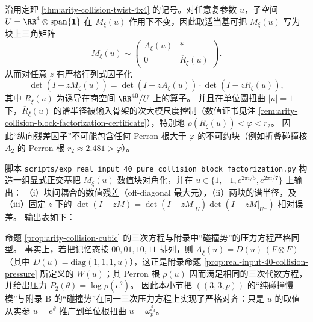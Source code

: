 \begin{remark}[块上三角分解与行列式因子化]\label{cor:arity-collision-det-factorization}
沿用定理 \ref{thm:arity-collision-twist-4x4} 的记号。对任意复参数 \(u\)，子空间
\(
U=\RR^{4}\otimes \mathrm{span}\{\mathbf{1}\}
\)
在 \(M_\xi(u)\) 作用下不变，因此取适当基可把 \(M_\xi(u)\) 写为块上三角矩阵
\[
M_\xi(u)\sim
\begin{pmatrix}
A_\xi(u) & *\\
0 & \overline R_\xi(u)
\end{pmatrix}.
\]
从而对任意 \(z\) 有严格行列式因子化
$$
\det(I-zM_\xi(u))=\det(I-zA_\xi(u))\cdot \det(I-z\overline R_\xi(u)),
$$
其中 \(\overline R_\xi(u)\) 为诱导在商空间 \(\RR^{40}/U\) 上的算子。
并且在单位圆扭曲 \(|u|=1\) 下，\(\overline R_\xi(u)\) 的谱半径被输入骨架的次大模尺度控制（数值证书见注 \ref{rem:arity-collision-block-factorization-certificate}），特别地 \(\rho(\overline R_\xi(u))<\varphi<r_2\)。
因此“纵向残差因子”不可能包含任何 Perron 根大于 \(\varphi\) 的不可约块（例如折叠碰撞核 \(A_2\) 的 Perron 根 \(r_2\approx 2.481>\varphi\)）。
\end{remark}

\begin{remark}\label{rem:arity-collision-block-factorization-certificate}
脚本 \texttt{scripts/exp\_real\_input\_40\_pure\_collision\_block\_factorization.py} 构造一组显式正交基把 \(M_\xi(u)\) 数值块对角化，并在 \(u\in\{1,-1,e^{2\pi i/5},e^{2\pi i/7}\}\) 上输出：
（i）块间耦合的数值残差（off-diagonal 最大元），（ii）两块的谱半径，及（iii）固定 \(z\) 下的 \(\det(I-zM)=\det(I-zM|_U)\det(I-zM|_{U^\perp})\) 相对误差。
输出表如下：

\end{remark}

\begin{remark}\label{rem:arity-collision-cubic-align}
命题 \ref{prop:arity-collision-cubic} 的三次方程与附录中“碰撞势”的压力方程严格同型。
事实上，若把记忆态按 \(00,01,10,11\) 排列，则
\(
A_\xi(u)=D(u)\,(F\otimes F)
\)
（其中 \(D(u)=\mathrm{diag}(1,1,1,u)\)），这正是附录命题 \ref{prop:real-input-40-collision-pressure} 所定义的 \(W(u)\)；其 Perron 根 \(\rho(u)\) 因而满足相同的三次代数方程，并给出压力 \(P_2(\theta)=\log\rho(e^\theta)\)。
因此本小节把 \(((3,3,p))\) 的“纯碰撞慢模”与附录 B 的“碰撞势”在同一三次压力方程上实现了严格对齐：只是 \(u\) 的取值从实参 \(u=e^\theta\) 推广到单位根扭曲 \(u=\omega_p^{j_3}\)。
\end{remark}

